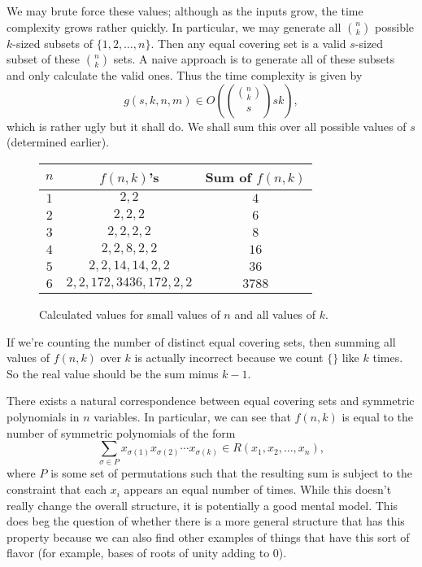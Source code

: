 \documentclass[a4paper, 12pt]{article}
\begin{document}
\begin{observation}
    We may brute force these values; although as the inputs grow, the time complexity grows rather quickly. In particular, we may generate all \( \binom{n}{k} \) possible \( k \)-sized subsets of \( \{ 1, 2, \ldots, n \} \). Then any equal covering set is a valid \( s \)-sized subset of these \( \binom{n}{k} \) sets. A naive approach is to generate all of these subsets and only calculate the valid ones. Thus the time complexity is given by
    \[
        g(s, k, n, m) \in O\left( \binom{\binom{n}{k}}{s} sk \right)
    ,\]
    which is rather ugly but it shall do. We shall sum this over all possible values of \( s \) (determined earlier).
\end{observation}

\begin{figure}[b]
    \centering
    \begin{tabular}{|c|c|c|}
        \hline
        \( n \) & \( f(n, k) \)'s & Sum of \( f(n, k) \) \\
        \hline
        \( 1 \) & \( 2, 2 \) & \( 4 \) \\
        \( 2 \) & \( 2, 2, 2 \) & \( 6 \) \\
        \( 3 \) & \( 2, 2, 2, 2 \) & \( 8 \) \\
        \( 4 \) & \( 2, 2, 8, 2, 2 \) & \( 16 \) \\
        \( 5 \) & \( 2, 2, 14, 14, 2, 2 \) & \( 36 \) \\
        \( 6 \) & \( 2, 2, 172, 3436, 172, 2, 2 \) & \( 3788 \) \\
        \hline
    \end{tabular}
    \caption{Calculated values for small values of \( n \) and all values of \( k \).}
\end{figure}

\begin{observation}
    If we're counting the number of distinct equal covering sets, then summing all values of \( f(n,k) \) over \( k \) is actually incorrect because we count \( \{\} \) like \( k \) times. So the real value should be the sum minus \( k - 1 \).
\end{observation}

\begin{observation}
    There exists a natural correspondence between equal covering sets and symmetric polynomials in \( n \) variables. In particular, we can see that \( f(n, k) \) is equal to the number of symmetric polynomials of the form
    \[
        \sum_{\sigma \in P} x_{\sigma(1)} x_{\sigma(2)} \cdots x_{\sigma(k)} \in R(x_1, x_2, \ldots, x_n)
    ,\]
    where \( P \) is some set of permutations such that the resulting sum is subject to the constraint that each \( x_i \) appears an equal number of times. While this doesn't really change the overall structure, it is potentially a good mental model. This does beg the question of whether there is a more general structure that has this property because we can also find other examples of things that have this sort of flavor (for example, bases of roots of unity adding to \( 0 \)).
\end{observation}
\end{document}
